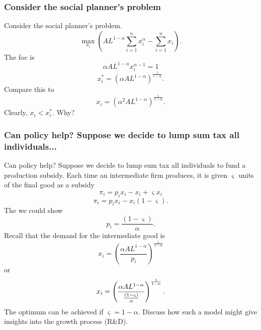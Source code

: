 \documentclass[aspectratio=169]{ltx-talk}
\begin{document}
\begin{frame}
\frametitle{Consider the social planner{'}s problem}
Consider the social planner's problem. 
\begin{equation*}
\underset{x_{i}}{\max }\left( AL^{1-\alpha }\overset{n}{\underset{i=1}{\sum }%
}x_{i}^{\alpha }-\overset{n}{\underset{i=1}{\sum }}x_{i}\right) .
\end{equation*}%
The foc is 
\begin{equation*}
\alpha AL^{1-\alpha }x_{i}^{\alpha -1}=1
\end{equation*}%
\begin{equation*}
x_{i}^{\ast }=\left( \alpha AL^{1-\alpha }\right) ^{\frac{1}{1-\alpha }}.
\end{equation*}%
Compare this to 
\begin{equation*}
x_{i}=\left( \alpha ^{2}AL^{1-\alpha }\right) ^{\frac{1}{1-\alpha }}.
\end{equation*}%
Clearly, $x_{i}<x_{i}^{\ast }$. Why?
\end{frame}

\begin{frame}
\frametitle{Can policy help? Suppose we decide to lump sum tax all individuals...}
Can policy help? Suppose we decide to lump sum tax all individuals to fund a
production subsidy. Each time an intermediate firm produces, it is given $%
\varsigma $ units of the final good as a subsidy 
\begin{equation*}
\pi _{i}=p_{i}x_{i}-x_{i}+\varsigma x_{i}
\end{equation*}%
\begin{equation*}
\pi _{i}=p_{i}x_{i}-x_{i}\left( 1-\varsigma \right) .
\end{equation*}%
The we could show 
\begin{equation*}
p_{i}=\frac{\left( 1-\varsigma \right) }{\alpha }.
\end{equation*}%
Recall that the demand for the intermediate good is 
\begin{equation*}
x_{i}=\left( \frac{\alpha AL^{1-\alpha }}{p_{i}}\right) ^{\frac{1}{1-\alpha }%
}
\end{equation*}%
or%
\begin{equation*}
x_{i}=\left( \frac{\alpha AL^{1-\alpha }}{\frac{\left( 1-\varsigma \right) }{%
\alpha }}\right) ^{\frac{1}{1-\alpha }}.
\end{equation*}%
The optimum can be achieved if $\varsigma =1-\alpha .$ Discuss how such a
model might give insights into the growth process (R\&D).
\end{frame}
\end{document}
